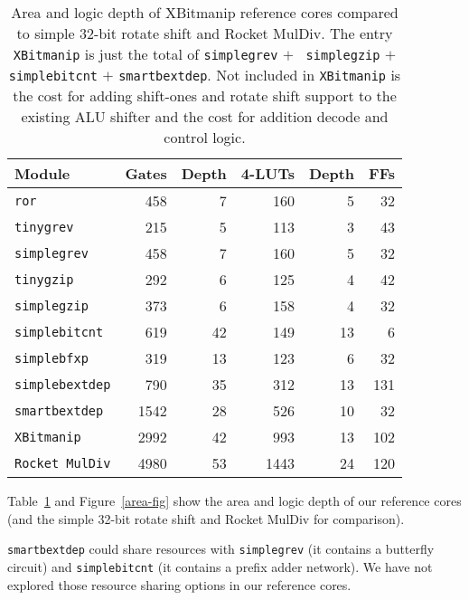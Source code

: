 \begin{table}[h]
\begin{center}
\begin{tabular}{l|rr|rr|r}
Module & Gates & Depth & 4-LUTs & Depth & FFs \\
\hline
{\tt ror} & 458 & 7 & 160 & 5 & 32 \\
\hline
{\tt tinygrev} & 215 & 5 & 113 & 3 & 43 \\
{\tt simplegrev} & 458 & 7 & 160 & 5 & 32 \\
\hline
{\tt tinygzip} & 292 & 6 & 125 & 4 & 42 \\
{\tt simplegzip} & 373 & 6 & 158 & 4 & 32 \\
\hline
{\tt simplebitcnt} & 619 & 42 & 149 & 13 & 6 \\
\hline
{\tt simplebfxp} & 319 & 13 & 123 & 6 & 32 \\
\hline
{\tt simplebextdep} & 790 & 35 & 312 & 13 & 131 \\
{\tt smartbextdep} & 1542 & 28 & 526 & 10 & 32 \\
\hline
{\tt XBitmanip} & 2992 & 42 & 993 & 13 & 102 \\
{\tt Rocket MulDiv} & 4980 & 53 & 1443 & 24 & 120 \\
\end{tabular}
\end{center}
\caption{Area and logic depth of XBitmanip reference cores compared to simple 32-bit rotate
shift and Rocket MulDiv. The entry {\tt XBitmanip} is just the total of {\tt simplegrev} $+$ {\tt
simplegzip} $+$ {\tt simplebitcnt} $+$ {\tt smartbextdep}. Not included in {\tt XBitmanip} is the
cost for adding shift-ones and rotate shift support to the existing ALU
shifter and the cost for addition decode and control logic.}
\label{area-tab}
\end{table}

Table~\ref{area-tab} and Figure~\ref{area-fig} show the area and logic depth of
our reference cores (and the simple 32-bit rotate shift and Rocket MulDiv for
comparison).

{\tt smartbextdep} could share resources with {\tt simplegrev} (it contains
a butterfly circuit) and {\tt simplebitcnt} (it contains a prefix adder network).
We have not explored those resource sharing options in our reference cores.
